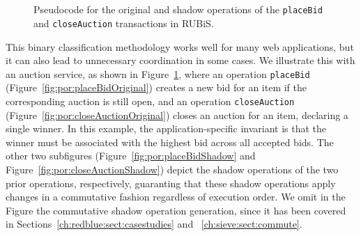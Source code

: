 \begin{figure}[t!]
\begin{minipage}[t]{0.495\columnwidth}
\centering
{}
\\
\end{minipage}
\hspace{2mm}
\begin{minipage}[t]{0.495\columnwidth}
\centering
{}
\\
\end{minipage}
\caption{Pseudocode for the original and shadow operations of the {\tt placeBid} and {\tt closeAuction} transactions in RUBiS.}
\label{fig:por:originalandshadow}
\end{figure}

This binary classification methodology works well for many web applications, 
but it can also lead to unnecessary coordination in some cases.
We illustrate this with an auction service, as shown in Figure~\ref{fig:por:originalandshadow},
 where an operation {\tt placeBid} (Figure~\ref{fig:por:placeBidOriginal}) creates 
a new bid for an item if the corresponding auction is still open, and an 
operation {\tt closeAuction} (Figure~\ref{fig:por:closeAuctionOriginal}) closes 
an auction for an item, declaring a single winner. In this example, the application-specific invariant 
is that the winner must be associated with the highest bid across all accepted bids. The
other two subfigures (Figure~\ref{fig:por:placeBidShadow} and Figure~\ref{fig:por:closeAuctionShadow})
depict the shadow operations of the two prior operations, respectively, guaranting
that these shadow operations apply changes in a commutative fashion regardless of execution order.
We omit in the Figure the commutative shadow operation generation, since it has been covered in Sections~\ref{ch:redblue:sect:casestudies}
and ~\ref{ch:sieve:sect:commute}.

